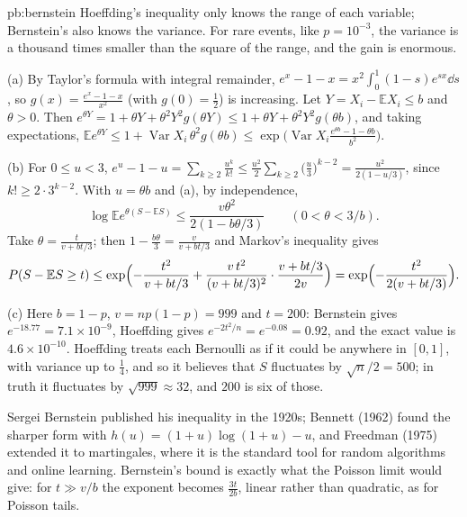\begin{solution}{pb:bernstein}
\idea Hoeffding's inequality only knows the range of each variable; Bernstein's also knows the variance. For rare events, like $p=10^{-3}$, the variance is a thousand times
smaller than the square of the range, and the gain is enormous.

\writeup (a) By Taylor's formula with integral remainder, $e^x-1-x=x^2\int_0^1(1-s)e^{sx}\dd s$, so $g(x)=\frac{e^x-1-x}{x^2}$ (with $g(0)=\frac12$) is increasing. Let
$Y=X_i-\mathbb EX_i\le b$ and $\theta>0$. Then $e^{\theta Y}=1+\theta Y+\theta^2Y^2g(\theta Y)\le1+\theta Y+\theta^2Y^2g(\theta b)$, and taking expectations,
$\mathbb Ee^{\theta Y}\le1+\operatorname{Var}X_i\,\theta^2g(\theta b)\le\exp\bigl(\operatorname{Var}X_i\frac{e^{\theta b}-1-\theta b}{b^2}\bigr)$.

(b) For $0\le u<3$, $e^u-1-u=\sum_{k\ge2}\frac{u^k}{k!}\le\frac{u^2}2\sum_{k\ge2}\bigl(\frac u3\bigr)^{k-2}=\frac{u^2}{2(1-u/3)}$, since $k!\ge2\cdot3^{k-2}$. With $u=\theta b$ and (a), by
independence,
\[
\log\mathbb Ee^{\theta(S-\mathbb ES)}\le\frac{v\theta^2}{2(1-b\theta/3)}\qquad(0<\theta<3/b).
\]
Take $\theta=\frac t{v+bt/3}$; then $1-\frac{b\theta}3=\frac v{v+bt/3}$ and Markov's inequality gives
\[
P(S-\mathbb ES\ge t)\le\exp\Bigl(-\frac{t^2}{v+bt/3}+\frac{v\,t^2}{(v+bt/3)^2}\cdot\frac{v+bt/3}{2v}\Bigr)=\exp\Bigl(-\frac{t^2}{2(v+bt/3)}\Bigr).
\]

(c) Here $b=1-p$, $v=np(1-p)=999$ and $t=200$: Bernstein gives $e^{-18.77}=7.1\times10^{-9}$, Hoeffding gives $e^{-2t^2/n}=e^{-0.08}=0.92$, and the exact value is
$4.6\times10^{-10}$. Hoeffding treats each Bernoulli as if it could be anywhere in $[0,1]$, with variance up to $\frac14$, and so it believes that $S$ fluctuates by $\sqrt n/2=500$;
in truth it fluctuates by $\sqrt{999}\approx32$, and $200$ is six of those.

\leads Sergei Bernstein published his inequality in the 1920s; Bennett (1962) found the sharper form with $h(u)=(1+u)\log(1+u)-u$, and Freedman (1975) extended it to
martingales, where it is the standard tool for random algorithms and online learning. Bernstein's bound is exactly what the Poisson limit would give: for $t\gg v/b$ the exponent
becomes $\frac{3t}{2b}$, linear rather than quadratic, as for Poisson tails.
\end{solution}

